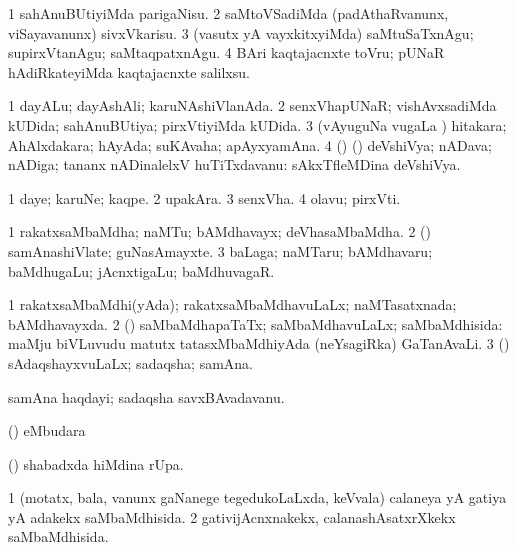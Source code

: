 \noindent
\gl{\pagu}
\bmng
\bnum
\num{1}  sahAnuBUtiyiMda parigaNisu. 
\num{2}  saMtoVSadiMda (padAthaRvanunx, viSayavanunx) sivxVkarisu. 
\num{3}  (vasutx yA vayxkitxyiMda) saMtuSaTxnAgu; supirxVtanAgu; saMtaqpatxnAgu. 
\num{4}  BAri kaqtajacnxte toVru; pUNaR hAdiRkateyiMda kaqtajacnxte salilxsu. 
\enum
\emng
\eentry

\bentry
{}
\gl{\gu}
\bmng
\bnum
\num{1} dayALu; dayAshAli; karuNAshiVlanAda. 
\num{2} senxVhapUNaR; vishAvxsadiMda kUDida; sahAnuBUtiya; pirxVtiyiMda kUDida. 
\num{3} (vAyuguNa \mo vugaLa \vi) hitakara; AhAlxdakara; hAyAda; suKAvaha; apAyxyamAna. 
\num{4} (\pArxparx) (\birx) deVshiVya; nADava; nADiga; tananx nADinalelxV huTiTxdavanu:  sAkxTfleMDina deVshiVya. 
\enum
\emng
\eentry

\bentry
{}
\gl{\nA}
\bmng
\bnum
\num{1} daye; karuNe; kaqpe. 
\num{2} upakAra. 
\num{3} senxVha. 
\num{4} olavu; pirxVti. 
\enum
\emng
\eentry

\bentry
{}
\gl{\nA}
\bmng
\bnum
\num{1} rakatxsaMbaMdha; naMTu; bAMdhavayx; deVhasaMbaMdha. 
\num{2} (\rUpa) samAnashiVlate; guNasAmayxte. 
\num{3} baLaga; naMTaru; bAMdhavaru; baMdhugaLu; jAcnxtigaLu; baMdhuvagaR. 
\enum
\emng
\eentry

\bentry
{}
\gl{\gu}
\bmng
\bnum
\num{1} rakatxsaMbaMdhi(yAda); rakatxsaMbaMdhavuLaLx; naMTasatxnada; bAMdhavayxda. 
\num{2} (\rUpa) saMbaMdhapaTaTx; saMbaMdhavuLaLx; saMbaMdhisida:  maMju biVLuvudu matutx tatasxMbaMdhiyAda (neYsagiRka) GaTanAvaLi. 
\num{3} (\rUpa) sAdaqshayxvuLaLx; sadaqsha; samAna. 
\enum
\emng

\noindent
\gl{\pagu}
\bmng
{} 
 samAna haqdayi; sadaqsha savxBAvadavanu. 
\emng
\eentry

\bentry
{}
\gl{\nA}
\bmng
(\pArxparx)  eMbudara \bava 
\emng
\eentry

\bentry
{}
\gl{\nA}
\bmng
(\pArxparx)  shabadxda hiMdina rUpa. 
\emng
\eentry

\bentry
{}
\gl{\gu}
\bmng
\bnum
\num{1} (motatx, bala, \mo vanunx gaNanege tegedukoLaLxda, keVvala) calaneya yA gatiya yA adakekx saMbaMdhisida. 
\num{2} gativijAcnxnakekx, calanashAsatxrXkekx saMbaMdhisida. 
\enum
\emng
\eentry

